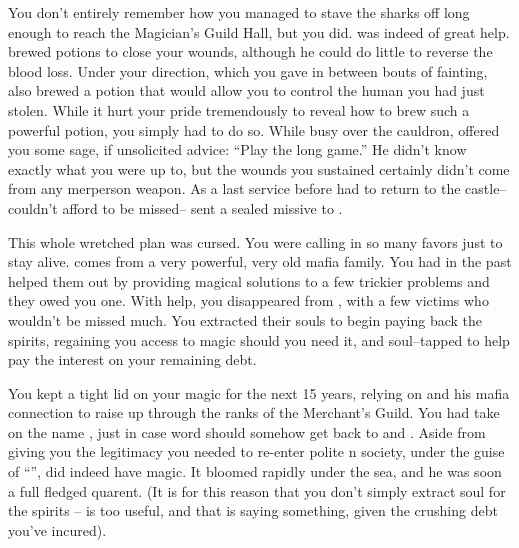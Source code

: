 \documentclass[char]{NeptuneBall}
\begin{document}
You don't entirely remember how you managed to stave the sharks off long enough to reach the Magician's Guild Hall, but you did. \cManta{} was indeed of great help. \cManta{\They} brewed potions to close your wounds, although he could do little to reverse the blood loss. Under your direction, which you gave in between bouts of fainting, \cManta{} also brewed a potion that would allow you to control the human \cSlave{\prince} you had just stolen. While it hurt your pride tremendously to reveal how to brew such a powerful potion, you simply had to do so. While busy over the cauldron, \cManta{} offered you some sage, if unsolicited advice: ``Play the long game.'' He didn't know exactly what you were up to, but the wounds you sustained certainly didn't come from any merperson weapon.  As a last service before \cManta{} had to return to the castle-- \cManta{\they} couldn't afford to be missed-- \cManta{} sent a sealed missive to \cPriest{}.

This whole wretched plan was cursed. You were calling in so many favors just to stay alive. \cPriest{} comes from a very powerful, very old mafia family. You had in the past helped them out by providing magical solutions to a few trickier problems and they owed you one.  With \cPriest{\their} help, you disappeared from \pAtlantis{}, with a few victims who wouldn't be missed much. You extracted their souls to begin paying back the spirits, regaining you access to magic should you need it, and soul--tapped \cSlave{} to help pay the interest on your remaining debt.

You kept a tight lid on your magic for the next 15 years, relying on \cPriest{} and his mafia connection to raise \cSlave{} up through the ranks of the Merchant's Guild. You had \cSlave{} take on the name \cSlave{\MYname}, just in case word should somehow get back to \cAriel{} and \cEric{}. Aside from giving you the legitimacy you needed to re-enter polite \pAtlantis{}n society, under the guise of ``\cWitch{\MYname}'', \cSlave{} did indeed have magic. It bloomed rapidly under the sea, and he was soon a full fledged quarent. (It is for this reason that you don't simply extract \cSlave{\their} soul for the spirits -- \cSlave{\they} is too useful, and that is saying something, given the crushing debt you've incured).

\end{document}
